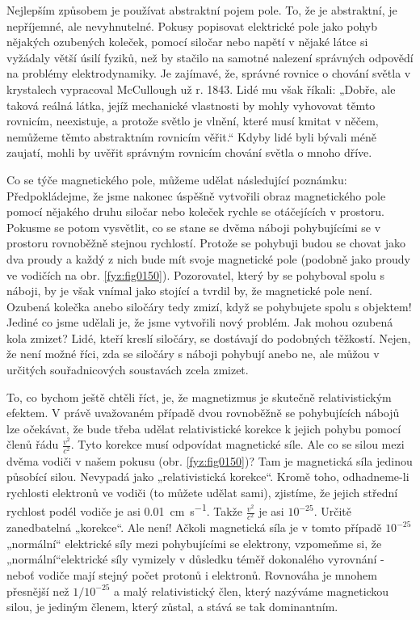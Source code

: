     Nejlepším způsobem je používat abstraktní pojem pole. To, že je abstraktní, je nepříjemné, ale  
    nevyhnutelné. Pokusy popisovat elektrické pole jako pohyb nějakých ozubených koleček, pomocí
    siločar nebo napětí v nějaké látce si vyžádaly větší úsilí fyziků, než by stačilo na samotné
    nalezení správných odpovědí na problémy elektrodynamiky. Je zajímavé, že, správné rovnice o
    chování světla v krystalech vypracoval McCullough už r. 1843. Lidé mu však říkali: „Dobře, ale
    taková reálná látka, jejíž mechanické vlastnosti by mohly vyhovovat těmto rovnicím, neexistuje,
    a protože světlo je vlnění, které musí kmitat v něčem, nemůžeme těmto abstraktním rovnicím
    věřit.“ Kdyby lidé byli bývali méně zaujatí, mohli by uvěřit správným rovnicím chování světla o
    mnoho dříve.
    
    Co se týče magnetického pole, můžeme udělat následující poznámku: Předpokládejme, že jsme
    nakonec úspěšně vytvořili obraz magnetického pole pomocí nějakého druhu siločar nebo koleček
    rychle se otáčejících v prostoru. Pokusme se potom vysvětlit, co se stane se dvěma náboji
    pohybujícími se v prostoru rovnoběžně stejnou rychlostí. Protože se pohybuji budou se chovat
    jako dva proudy a každý z nich bude mít svoje magnetické pole (podobně jako proudy ve vodičích
    na obr. \ref{fyz:fig0150}). Pozorovatel, který by se pohyboval spolu s náboji, by je však vnímal
    jako stojící a tvrdil by, že magnetické pole není. Ozubená kolečka anebo siločáry tedy zmizí,
    když se pohybujete spolu s objektem! Jediné co jsme udělali je, že jsme vytvořili nový problém.
    Jak mohou ozubená kola zmizet? Lidé, kteří kreslí siločáry, se dostávají do podobných těžkostí.
    Nejen, že není možné říci, zda se siločáry s náboji pohybují anebo ne, ale můžou v určitých
    souřadnicových soustavách zcela zmizet.
    
    To, co bychom ještě chtěli říct, je, že magnetizmus je skutečně relativistickým efektem. V právě
    uvažovaném případě dvou rovnoběžně se pohybujících nábojů lze očekávat, že bude třeba udělat  
    relativistické korekce k jejich pohybu pomocí členů řádu \(\frac{v^2}{c^2}\). Tyto korekce musí
    odpovídat magnetické síle. Ale co se silou mezi dvěma vodiči v našem pokusu (obr.
    \ref{fyz:fig0150})? Tam je magnetická síla jedinou působící silou. Nevypadá jako „relativistická
    korekce“. Kromě toho, odhadneme-li rychlosti elektronů ve vodiči (to můžete udělat sami),
    zjistíme, že jejich střední rychlost podél vodiče je asi \qty{0,01}{\centi\metre\per\second}.
    Takže \(\frac{v^2}{c^2}\) je asi \(10^{-25}\). Určitě zanedbatelná „korekce“. Ale není! Ačkoli
    magnetická síla je v tomto případě \(10^{-25}\) „normální“ elektrické síly mezi pohybujícími se
    elektrony, vzpomeňme si, že „normální“elektrické síly vymizely v důsledku téměř dokonalého
    vyrovnání - neboť vodiče mají stejný počet protonů i elektronů. Rovnováha je mnohem přesnější
    než \(1/10^{-25}\) a malý relativistický člen, který nazýváme magnetickou silou, je jediným
    členem, který zůstal, a stává se tak dominantním.
    
